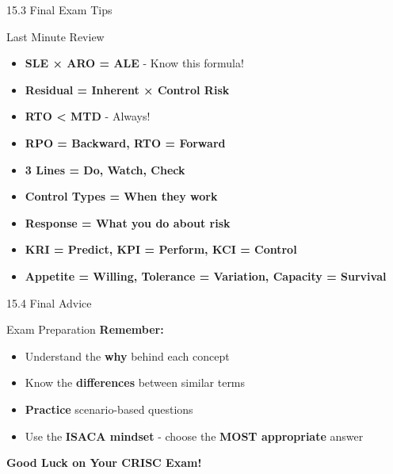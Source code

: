 \documentclass{beamer}
\begin{document}
	\begin{frame}{15.3 Final Exam Tips}
		\begin{block}{Last Minute Review}
			\begin{itemize}
				\item \textbf{SLE × ARO = ALE} - Know this formula!
				\item \textbf{Residual = Inherent × Control Risk}
				\item \textbf{RTO < MTD} - Always!
				\item \textbf{RPO = Backward, RTO = Forward}
				\item \textbf{3 Lines = Do, Watch, Check}
				\item \textbf{Control Types = When they work}
				\item \textbf{Response = What you do about risk}
				\item \textbf{KRI = Predict, KPI = Perform, KCI = Control}
				\item \textbf{Appetite = Willing, Tolerance = Variation, Capacity = Survival}
			\end{itemize}
		\end{block}
	\end{frame}
	
	\begin{frame}{15.4 Final Advice}
		\begin{block}{Exam Preparation}
			\centering
			\vspace{0.3cm}
			\textbf{Remember:}
			\begin{itemize}
				\item Understand the \textbf{why} behind each concept
				\item Know the \textbf{differences} between similar terms
				\item \textbf{Practice} scenario-based questions
				\item Use the \textbf{ISACA mindset} - choose the \textbf{MOST appropriate} answer
			\end{itemize}
			\vspace{0.5cm}
			\Large{\textbf{Good Luck on Your CRISC Exam!}}
		\end{block}
	\end{frame}
	
	
\end{document}

